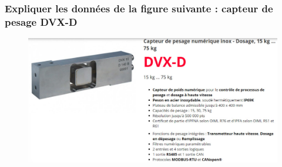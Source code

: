\documentclass{article}
\begin{document}
\subsubsection{Expliquer les données de la figure suivante : capteur de pesage DVX-D}
\begin{figure}[H]
    \centering
    \includegraphics[width=\linewidth]{./images/capteur-force-scaime.jpg}
\end{figure}
\end{document}
